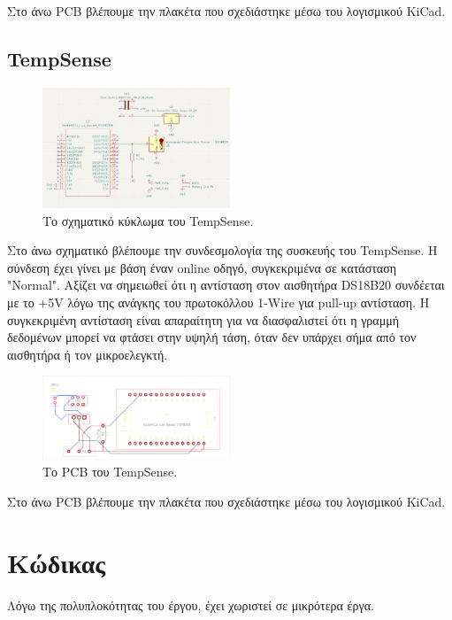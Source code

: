 \documentclass[conference]{IEEEtran}
\begin{document}
Στο άνω PCB βλέπουμε την πλακέτα που σχεδιάστηκε μέσω του λογισμικού KiCad.

\subsection{TempSense}

\begin{figure}[H]
	\centerline{\includegraphics[width=0.5\textwidth]{assets/tempsense-schematic}}
	\caption{Το σχηματικό κύκλωμα του TempSense.}
	\label{Το σχηματικό κύκλωμα του TempSense.}
\end{figure}

Στο άνω σχηματικό βλέπουμε την συνδεσμολογία της συσκευής του TempSense. Η σύνδεση έχει γίνει με βάση έναν online οδηγό, συγκεκριμένα σε κατάσταση "Normal". \cite{mq6connect} Αξίζει να σημειωθεί ότι η αντίσταση στον αισθητήρα DS18B20 συνδέεται με το +5V λόγω της ανάγκης του πρωτοκόλλου 1-Wire για pull-up αντίσταση. Η συγκεκριμένη αντίσταση είναι απαραίτητη για να διασφαλιστεί ότι η γραμμή δεδομένων μπορεί να φτάσει στην υψηλή τάση, όταν δεν υπάρχει σήμα από τον αισθητήρα ή τον μικροελεγκτή. \cite{ds18b20connect}

\begin{figure}[H]
	\colorbox{PineGreen}{\centerline{\includegraphics[width=0.5\textwidth]{assets/TempSense-brd}}}
	\caption{Το PCB του TempSense.}
	\label{Το PCB του TempSense.}
\end{figure}

Στο άνω PCB βλέπουμε την πλακέτα που σχεδιάστηκε μέσω του λογισμικού KiCad.

\section{Κώδικας}
Λόγω της πολυπλοκότητας του έργου, έχει χωριστεί σε μικρότερα έργα.
\end{document}
